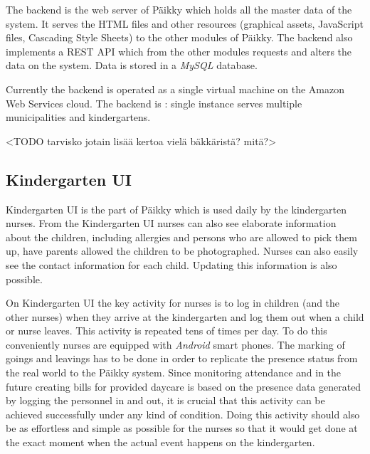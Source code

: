 The backend is the web server of Päikky which holds all the master data of the system. It serves the HTML files and other resources (graphical assets, JavaScript files, Cascading Style Sheets) to the other modules of Päikky. The backend also implements a REST API which from the other modules requests and alters the data on the system. Data is stored in a \textit{MySQL} database.

Currently the backend is operated as a single virtual machine on the Amazon Web Services cloud. The backend is : single instance serves multiple municipalities and kindergartens. %



<TODO tarvisko jotain lisää kertoa vielä bäkkäristä? mitä?>

\subsection{Kindergarten UI}

Kindergarten UI is the part of Päikky which is used daily by the kindergarten nurses. From the Kindergarten UI nurses can also see elaborate information about the children, including allergies and persons who are allowed to pick them up, have parents allowed the children to be photographed. Nurses can also easily see the contact information for each child. Updating this information is also possible. %

On Kindergarten UI the key activity for nurses is to log in children (and the other nurses) when they arrive at the kindergarten and log them out when a child or nurse leaves. This activity is repeated tens of times per day. To do this conveniently nurses are equipped with \textit{Android} smart phones. The marking of goings and leavings has to be done in order to replicate the presence status from the real world to the Päikky system. Since monitoring attendance and in the future creating bills for provided daycare is based on the presence data generated by logging the personnel in and out, it is crucial that this activity can be achieved successfully under any kind of condition. Doing this activity should also be as effortless and simple as possible for the nurses so that it would get done at the exact moment when the actual event happens on the kindergarten. 

